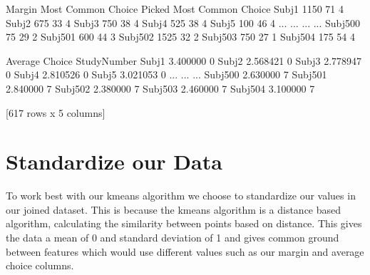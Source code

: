 \documentclass[letterpaper,10pt,english]{jupyterBook}
\begin{document}
\begin{sphinxVerbatim}[commandchars=\\\{\}]
          Margin  Most Common Choice Picked  Most Common Choice  \PYGZbs{}
Subj\PYGZus{}1      1150                         71                   4   
Subj\PYGZus{}2      \PYGZhy{}675                         33                   4   
Subj\PYGZus{}3      \PYGZhy{}750                         38                   4   
Subj\PYGZus{}4      \PYGZhy{}525                         38                   4   
Subj\PYGZus{}5       100                         46                   4   
...          ...                        ...                 ...   
Subj\PYGZus{}500      75                         29                   2   
Subj\PYGZus{}501     600                         44                   3   
Subj\PYGZus{}502   \PYGZhy{}1525                         32                   2   
Subj\PYGZus{}503    \PYGZhy{}750                         27                   1   
Subj\PYGZus{}504     175                         54                   4   

          Average Choice  StudyNumber  
Subj\PYGZus{}1          3.400000            0  
Subj\PYGZus{}2          2.568421            0  
Subj\PYGZus{}3          2.778947            0  
Subj\PYGZus{}4          2.810526            0  
Subj\PYGZus{}5          3.021053            0  
...                  ...          ...  
Subj\PYGZus{}500        2.630000            7  
Subj\PYGZus{}501        2.840000            7  
Subj\PYGZus{}502        2.380000            7  
Subj\PYGZus{}503        2.460000            7  
Subj\PYGZus{}504        3.100000            7  

[617 rows x 5 columns]
\end{sphinxVerbatim}

\begin{sphinxVerbatim}[commandchars=\\\{\}]
\end{sphinxVerbatim}


\section{Standardize our Data}
\label{\detokenize{data-processing:standardize-our-data}}
\sphinxAtStartPar
To work best with our k\sphinxhyphen{}means algorithm we choose to standardize our values in our joined dataset. This is because the k\sphinxhyphen{}means algorithm is a distance based algorithm, calculating the similarity between points based on distance. This gives the data a mean of 0 and standard deviation of 1 and gives common ground between features which would use different values such as our margin and average choice columns.
\end{document}
